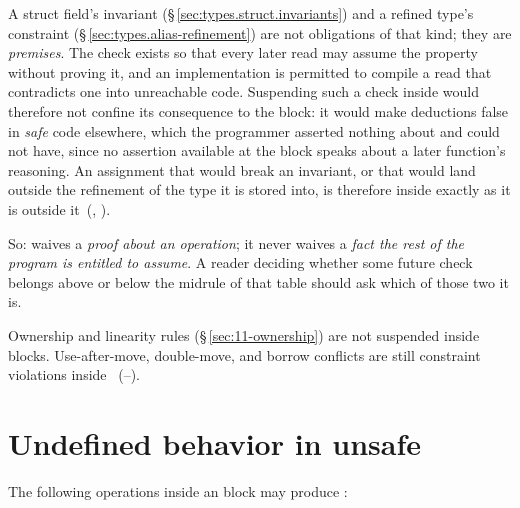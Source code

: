 \pnum
A struct field's invariant (\S\,\ref{sec:types.struct.invariants}) and a refined type's constraint
(\S\,\ref{sec:types.alias-refinement}) are not obligations of that kind; they are \emph{premises}.
The check exists so that every later read may assume the property without proving it, and an
implementation is permitted to compile a read that contradicts one into unreachable code.
Suspending such a check inside  would therefore not confine its consequence to the
block: it would make deductions false in \emph{safe} code elsewhere, which the programmer asserted
nothing about and could not have, since no assertion available at the  block speaks
about a later function's reasoning.  An assignment that would break an invariant, or that would
land outside the refinement of the type it is stored into, is therefore \illformed{} inside
 exactly as it is outside
it~(, ).

\pnum
So:  waives a \emph{proof about an operation}; it never waives a \emph{fact the rest
of the program is entitled to assume}.  A reader deciding whether some future check belongs above
or below the midrule of that table should ask which of those two it is.

\begin{constraint}
  Ownership and linearity rules (\S\,\ref{sec:11-ownership}) are not
  suspended inside  blocks.  Use-after-move, double-move,
  and borrow conflicts are still constraint violations inside
  ~(--).
\end{constraint}

\section{Undefined behavior in unsafe}
\label{sec:unsafe.ub}

\pnum
The following operations inside an  block may produce
:

